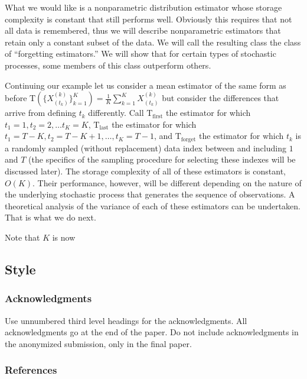 \documentclass{article} %
\newcommand{\estimator}{\mbox{T}}
\begin{document}
What we would like is a nonparametric distribution estimator whose storage complexity is constant that still performs well.  Obviously this requires that not all data is remembered, thus we will describe nonparametric estimators that retain only a constant subset of the data.  We will call the resulting class the class of ``forgetting estimators.''  We will show that for certain types of stochastic processes, some members of this class outperform others.  

Continuing our example let us consider a mean estimator of the same form as before $\estimator(\{X^{(k)}_{(t_k)}\}_{k=1}^K) = \frac{1}{K} \sum_{k=1}^{K} X^{(k)}_{(t_k)}$ but consider the differences that arrive from defining $t_k$ differently.  Call $\estimator_{\text{first}}$ the estimator for which $t_1 = 1, t_2 =2, \ldots t_K = K$, $\estimator_{\text{last}}$ the estimator for which $t_1 = T-K, t_2 =T-K+1, \ldots, t_K = T-1$, and $\estimator_{\text{forget}}$ the estimator for which $t_k$ is a randomly sampled (without replacement) data index between and including $1$ and $T$ (the specifics of the sampling procedure for selecting these indexes will be discussed later).  The storage complexity of all of these estimators is constant, $O(K)$.   Their performance, however, will be different depending on the nature of the underlying stochastic process that generates the sequence of observations.  A theoretical analysis of the variance of each of these estimators can be undertaken.  That is what we do next.

Note that $K$ is now 





\subsection{Style}

\subsubsection*{Acknowledgments}

Use unnumbered third level headings for the acknowledgments. All
acknowledgments go at the end of the paper. Do not include 
acknowledgments in the anonymized submission, only in the 
final paper. 

\subsubsection*{References}



\begin{small}

 
%
\end{small}
\end{document}
